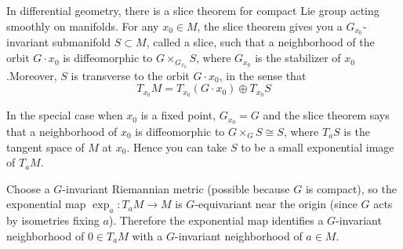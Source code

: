 \documentclass[12pt]{article}
\begin{document}
\begin{remark}
    In differential geometry, there is a slice theorem for compact Lie group acting smoothly on manifolds. For any $x_0 \in M$, the slice theorem gives you a $G_{x_0}$-invariant submanifold $S \subset M$, called a slice, such that a neighborhood of the orbit $G\cdot x_0$ is diffeomorphic to $G \times_{G_{x_0}} S$, where $G_{x_0}$ is the stabilizer of $x_0$.Moreover, $S$ is transverse to the orbit $G\cdot x_0$, in the sense that \[T_{x_0}M = T_{x_0}(G\cdot x_0) \oplus T_{x_0}S\]

In the special case when $x_0$ is a fixed point, $G_{x_0} = G$ and the slice theorem says that a neighborhood of $x_0$ is diffeomorphic to $G \times_G S \cong S$, where $T_aS$ is the tangent space of $M$ at $x_0$. Hence you can take $S$ to be a small exponential image of $T_aM$.

Choose a $G$-invariant Riemannian metric (possible because $G$ is compact), so the exponential map $\exp_a : T_aM \to M$ is $G$-equivariant near the origin (since $G$ acts by isometries fixing $a$). Therefore the exponential map identifies a $G$-invariant neighborhood of $0\in T_aM$
with a $G$-invariant neighborhood of $a\in M$.

\end{remark}
\end{document}

